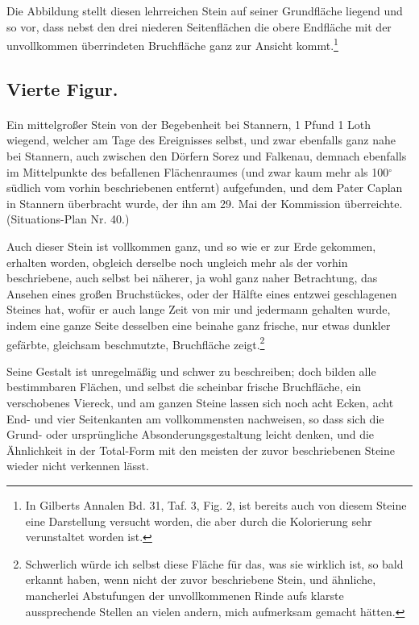 \documentclass[a4paper, 11pt, oneside, german]{article}
\begin{document}
Die Abbildung stellt diesen lehrreichen Stein auf seiner Grundfläche liegend und so vor, dass nebst den drei niederen Seitenflächen die obere Endfläche mit der unvollkommen überrindeten Bruchfläche ganz zur Ansicht kommt.\footnote{In Gilberts Annalen Bd. 31, Taf. 3, Fig. 2, ist bereits auch von diesem Steine eine Darstellung versucht worden, die aber durch die Kolorierung sehr verunstaltet worden ist.}

\subsection{Vierte Figur.}
\paragraph{}
Ein mittelgroßer Stein von der Begebenheit bei Stannern, 1 Pfund 1 Loth wiegend, welcher am Tage des Ereignisses selbst, und zwar ebenfalls ganz nahe bei Stannern, auch zwischen den Dörfern Sorez und Falkenau, demnach ebenfalls im Mittelpunkte des befallenen Flächenraumes (und zwar kaum mehr als 100$^{\circ}$ südlich vom vorhin beschriebenen entfernt) aufgefunden, und dem Pater Caplan in Stannern überbracht wurde, der ihn am 29. Mai der Kommission überreichte. (Situations-Plan Nr. 40.)

Auch dieser Stein ist vollkommen ganz, und so wie er zur Erde gekommen, erhalten worden, obgleich derselbe noch ungleich mehr als der vorhin beschriebene, auch selbst bei näherer, ja wohl ganz naher Betrachtung, das Ansehen eines großen Bruchstückes, oder der Hälfte eines entzwei geschlagenen Steines hat, wofür er auch lange Zeit von mir und jedermann gehalten wurde, indem eine ganze Seite desselben eine beinahe ganz frische, nur etwas dunkler gefärbte, gleichsam beschmutzte, Bruchfläche zeigt.\footnote{Schwerlich würde ich selbst diese Fläche für das, was sie wirklich ist, so bald erkannt haben, wenn nicht der zuvor beschriebene Stein, und ähnliche, mancherlei Abstufungen der unvollkommenen Rinde aufs klarste aussprechende Stellen an vielen andern, mich aufmerksam gemacht hätten.}

Seine Gestalt ist unregelmäßig und schwer zu beschreiben; doch bilden alle bestimmbaren Flächen, und selbst die scheinbar frische Bruchfläche, ein verschobenes Viereck, und am ganzen Steine lassen sich noch acht Ecken, acht End- und vier Seitenkanten am vollkommensten nachweisen, so dass sich die Grund- oder ursprüngliche Absonderungsgestaltung leicht denken, und die Ähnlichkeit in der Total-Form mit den meisten der zuvor beschriebenen Steine wieder nicht verkennen lässt.
\end{document}
